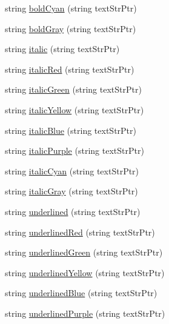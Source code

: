 \begin{DoxyCompactItemize}
\item 
string \hyperlink{namespace_unix_console_text_a7e4b2f3fdaee8993fd21649b75b70343}{bold\-Cyan} (string text\-Str\-Ptr)
\item 
string \hyperlink{namespace_unix_console_text_ad3a5ef8736b73c5eb0f7abc39904e4cf}{bold\-Gray} (string text\-Str\-Ptr)
\item 
string \hyperlink{namespace_unix_console_text_abfde2ec32bf1bea4c0cedc4f297446dc}{italic} (string text\-Str\-Ptr)
\item 
string \hyperlink{namespace_unix_console_text_a69ee750c96098c0fbe67c992198e9821}{italic\-Red} (string text\-Str\-Ptr)
\item 
string \hyperlink{namespace_unix_console_text_acd96f94564197e038043dd14cb136f24}{italic\-Green} (string text\-Str\-Ptr)
\item 
string \hyperlink{namespace_unix_console_text_a9fc8def103dc8cb3f24bb68827bd1cf5}{italic\-Yellow} (string text\-Str\-Ptr)
\item 
string \hyperlink{namespace_unix_console_text_a7fe578273f051ca4c86838c8920c56ef}{italic\-Blue} (string text\-Str\-Ptr)
\item 
string \hyperlink{namespace_unix_console_text_a3770156c74063b76c2837d9ed06afacf}{italic\-Purple} (string text\-Str\-Ptr)
\item 
string \hyperlink{namespace_unix_console_text_a1aa7316745b9e2abd82944d97f4eb2cc}{italic\-Cyan} (string text\-Str\-Ptr)
\item 
string \hyperlink{namespace_unix_console_text_a48a08afe1e12367e7f9c404973980654}{italic\-Gray} (string text\-Str\-Ptr)
\item 
string \hyperlink{namespace_unix_console_text_adbf75b382ea454b5656a7d1b13ca5144}{underlined} (string text\-Str\-Ptr)
\item 
string \hyperlink{namespace_unix_console_text_acf46ca5fb4f2efc1ce234b6c952080f7}{underlined\-Red} (string text\-Str\-Ptr)
\item 
string \hyperlink{namespace_unix_console_text_a0bc3fac5de255c84b37f40868bb97ffe}{underlined\-Green} (string text\-Str\-Ptr)
\item 
string \hyperlink{namespace_unix_console_text_a023878a766cb70558d96b2f8c7256805}{underlined\-Yellow} (string text\-Str\-Ptr)
\item 
string \hyperlink{namespace_unix_console_text_a59106ace2f0e0c0c60ee970505f5d0d9}{underlined\-Blue} (string text\-Str\-Ptr)
\item 
string \hyperlink{namespace_unix_console_text_a0dc50aecf45d31e84c0c699ba6c9459b}{underlined\-Purple} (string text\-Str\-Ptr)

\end{DoxyCompactItemize}
